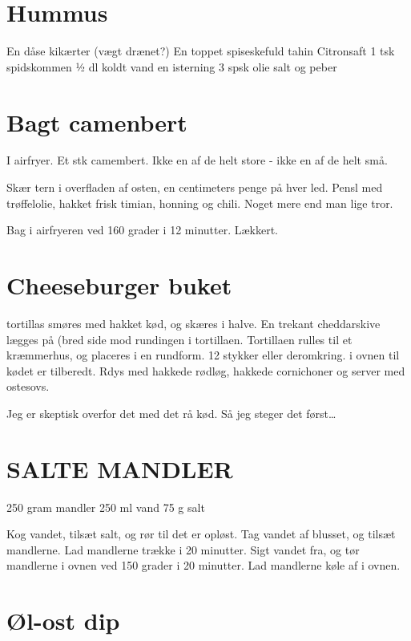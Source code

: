 \documentclass[
]{book}
\begin{document}
\section{Hummus}\label{hummus}

En dåse kikærter (vægt drænet?)
En toppet spiseskefuld tahin
Citronsaft
1 tsk spidskommen
½ dl koldt vand
en isterning
3 spsk olie
salt og peber

\section{Bagt camenbert}\label{bagt-camenbert}

I airfryer. Et stk camembert. Ikke en af de helt store - ikke en af de helt små.

Skær tern i overfladen af osten, en centimeters penge på hver led.
Pensl med trøffelolie, hakket frisk timian, honning og chili. Noget mere end man
lige tror.

Bag i airfryeren ved 160 grader i 12 minutter. Lækkert.

\section{Cheeseburger buket}\label{cheeseburger-buket}

tortillas smøres med hakket kød, og skæres i halve.
En trekant cheddarskive lægges på (bred side mod rundingen i tortillaen.
Tortillaen rulles til et kræmmerhus, og placeres i en rundform. 12 stykker eller
deromkring. i ovnen til kødet er tilberedt. Rdys med hakkede rødløg, hakkede
cornichoner og server med ostesovs.

Jeg er skeptisk overfor det med det rå kød. Så jeg steger det først\ldots{}

\section{SALTE MANDLER}\label{salte-mandler}

250 gram mandler
250 ml vand
75 g salt

Kog vandet, tilsæt salt, og rør til det er opløst.
Tag vandet af blusset, og tilsæt mandlerne.
Lad mandlerne trække i 20 minutter.
Sigt vandet fra, og tør mandlerne i ovnen ved 150 grader i 20 minutter. Lad mandlerne køle af i ovnen.

\section{Øl-ost dip}\label{uxf8l-ost-dip}
\end{document}
